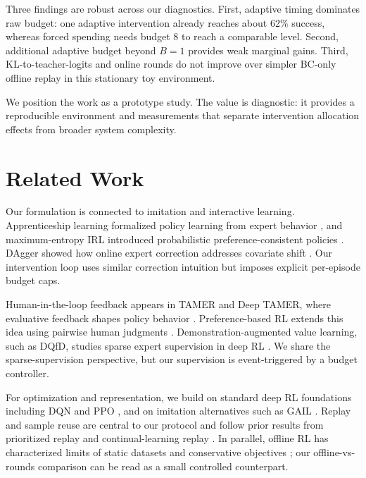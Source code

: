 \documentclass{article}
\begin{document}
Three findings are robust across our diagnostics. First, adaptive timing dominates raw budget: one adaptive intervention already reaches about 62\% success, whereas forced spending needs budget 8 to reach a comparable level. Second, additional adaptive budget beyond $B{=}1$ provides weak marginal gains. Third, KL-to-teacher-logits and online rounds do not improve over simpler BC-only offline replay in this stationary toy environment.

We position the work as a prototype study. The value is diagnostic: it provides a reproducible environment and measurements that separate intervention allocation effects from broader system complexity.

\section{Related Work}
Our formulation is connected to imitation and interactive learning. Apprenticeship learning formalized policy learning from expert behavior \citep{abbeel2004apprenticeship}, and maximum-entropy IRL introduced probabilistic preference-consistent policies \citep{ziebart2008maxent}. DAgger showed how online expert correction addresses covariate shift \citep{ross2011dagger}. Our intervention loop uses similar correction intuition but imposes explicit per-episode budget caps.

Human-in-the-loop feedback appears in TAMER and Deep TAMER, where evaluative feedback shapes policy behavior \citep{knox2008tamer,knox2009interactively,warnell2018deeptamer}. Preference-based RL extends this idea using pairwise human judgments \citep{christiano2017preferences}. Demonstration-augmented value learning, such as DQfD, studies sparse expert supervision in deep RL \citep{hester2018dqfd}. We share the sparse-supervision perspective, but our supervision is event-triggered by a budget controller.

For optimization and representation, we build on standard deep RL foundations including DQN and PPO \citep{mnih2015dqn,schulman2017ppo}, and on imitation alternatives such as GAIL \citep{ho2016gail}. Replay and sample reuse are central to our protocol and follow prior results from prioritized replay and continual-learning replay \citep{schaul2016prioritized,rolnick2019clear}. In parallel, offline RL has characterized limits of static datasets and conservative objectives \citep{levine2020offline,kumar2020cql,fujimoto2019bcq,kidambi2020morel,kostrikov2021iql}; our offline-vs-rounds comparison can be read as a small controlled counterpart.
\end{document}
